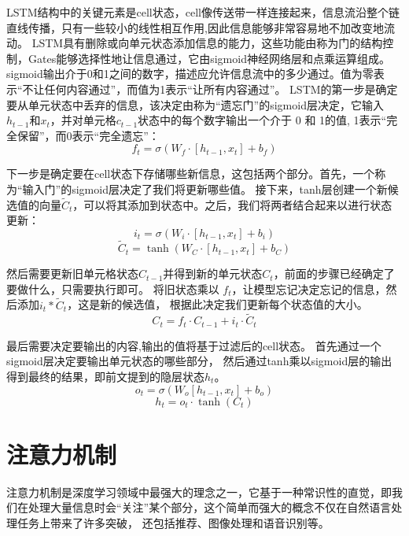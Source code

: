 LSTM结构中的关键元素是cell状态，cell像传送带一样连接起来，信息流沿整个链直线传播，只有一些较小的线性相互作用,因此信息能够非常容易地不加改变地流动。
LSTM具有删除或向单元状态添加信息的能力，这些功能由称为门的结构控制，Gates能够选择性地让信息通过，它由sigmoid神经网络层和点乘运算组成。
sigmoid输出介于0和1之间的数字，描述应允许信息流中的多少通过。值为零表示“不让任何内容通过”，而值为1表示“让所有内容通过”。
LSTM的第一步是确定要从单元状态中丢弃的信息，该决定由称为“遗忘门”的sigmoid层决定，它输入$h_{t-1}$和$x_{t}$，并对单元格$c_{t-1}$状态中的每个数字输出一个介于 0 和 1的值,
1表示“完全保留”，而0表示“完全遗忘”：
\begin{equation}
  f_{t}=σ(W_{f}\cdot[h_{t-1},x_t]+b_{f})
  \end{equation}

  下一步是确定要在cell状态下存储哪些新信息，这包括两个部分。首先，一个称为“输入门”的sigmoid层决定了我们将更新哪些值。
  接下来，tanh层创建一个新候选值的向量$\tilde{C}_{t}$，可以将其添加到状态中。之后，我们将两者结合起来以进行状态更新：
  \begin{equation}
    i_{t} =\sigma\left(W_{i} \cdot\left[h_{t-1}, x_{t}\right]+b_{i}\right) 
  \end{equation}  
    \begin{equation}
      \tilde{C}_{t} =\tanh \left(W_{C} \cdot\left[h_{t-1}, x_{t}\right]+b_{C}\right)
      \end{equation}   

然后需要更新旧单元格状态$C_{t-1}$并得到新的单元状态$C_{t}$，前面的步骤已经确定了要做什么，只需要执行即可。
将旧状态乘以 $f_{t}$，让模型忘记决定忘记的信息，然后添加$i_{t} * \tilde{C}_{t}$，这是新的候选值，
根据此决定我们更新每个状态值的大小。
\begin{equation}
C_{t}=f_{t} \cdot C_{t-1}+i_{t} \cdot \tilde{C}_{t}
\end{equation} 

最后需要决定要输出的内容,输出的值将基于过滤后的cell状态。
首先通过一个sigmoid层决定要输出单元状态的哪些部分，
然后通过tanh乘以sigmoid层的输出得到最终的结果，即前文提到的隐层状态$h_{t}$。
\begin{equation}
  o_{t}=\sigma\left(W_{o}\left[h_{t-1}, x_{t}\right]+b_{o}\right)
\end{equation} 
\begin{equation}
  h_{t}=o_{t} \cdot \tanh \left(C_{t}\right)
\end{equation}


\section{注意力机制}
注意力机制是深度学习领域中最强大的理念之一，它基于一种常识性的直觉，即我们在处理大量信息时会“关注”某个部分，这个简单而强大的概念不仅在自然语言处理任务上带来了许多突破，
还包括推荐、图像处理和语音识别等。

